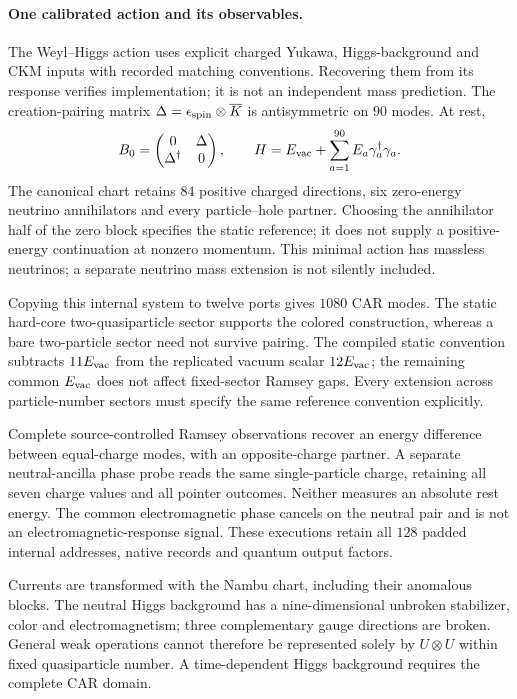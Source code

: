 \paragraph{One calibrated action and its observables.}
The Weyl--Higgs action uses explicit charged Yukawa, Higgs-background and
CKM inputs with recorded matching conventions. Recovering them from its
response verifies implementation; it is not an independent mass prediction.
The creation-pairing matrix $\Delta=\epsilon_{\rm spin}\otimes\overline K$
is antisymmetric on $90$ modes. At rest,
\[
 B_0=\begin{pmatrix}0&\Delta\\\Delta^\dagger&0\end{pmatrix},\qquad
 H=E_{\rm vac}+\sum_{a=1}^{90}E_a\gamma_a^\dagger\gamma_a.
\]
The canonical chart retains $84$ positive charged directions, six
zero-energy neutrino annihilators and every particle--hole partner.
Choosing the annihilator half of the zero block specifies the static
reference; it does not supply a positive-energy continuation at nonzero
momentum. This minimal action has massless neutrinos; a separate neutrino
mass extension is not silently included.

Copying this internal system to twelve ports gives $1080$ CAR modes.
The static hard-core two-quasiparticle sector supports the colored
construction, whereas a bare two-particle sector need not survive pairing.
The compiled static convention subtracts $11E_{\rm vac}$ from the replicated
vacuum scalar $12E_{\rm vac}$; the remaining common $E_{\rm vac}$ does not
affect fixed-sector Ramsey gaps. Every extension across particle-number
sectors must specify the same reference convention explicitly.

Complete source-controlled Ramsey observations recover an energy
difference between equal-charge modes, with an opposite-charge partner.
A separate neutral-ancilla phase probe reads the same single-particle
charge, retaining all seven charge values and all pointer outcomes.
Neither measures an absolute rest energy. The common electromagnetic
phase cancels on the neutral pair and is not an electromagnetic-response
signal. These executions retain all $128$ padded internal addresses,
native records and quantum output factors.

Currents are transformed with the Nambu chart, including their anomalous
blocks. The neutral Higgs background has a nine-dimensional unbroken
stabilizer, color and electromagnetism; three complementary gauge
directions are broken. General weak operations cannot therefore be
represented solely by $U\otimes U$ within fixed quasiparticle number.
A time-dependent Higgs background requires the complete CAR domain.

